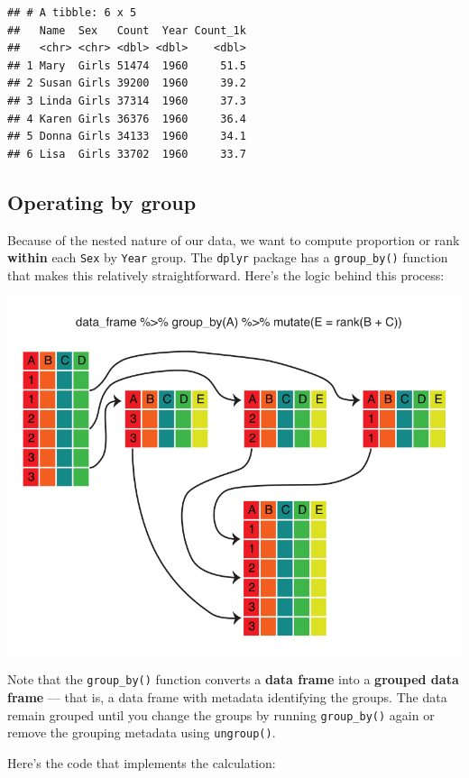\documentclass[
]{book}
\begin{document}
\begin{verbatim}
## # A tibble: 6 x 5
##   Name  Sex   Count  Year Count_1k
##   <chr> <chr> <dbl> <dbl>    <dbl>
## 1 Mary  Girls 51474  1960     51.5
## 2 Susan Girls 39200  1960     39.2
## 3 Linda Girls 37314  1960     37.3
## 4 Karen Girls 36376  1960     36.4
## 5 Donna Girls 34133  1960     34.1
## 6 Lisa  Girls 33702  1960     33.7
\end{verbatim}

\hypertarget{operating-by-group}{%
\subsection{Operating by group}\label{operating-by-group}}

Because of the nested nature of our data, we want to compute proportion
or rank \textbf{within} each \texttt{Sex} by \texttt{Year} group. The \texttt{dplyr}
package has a \texttt{group\_by()} function that makes this relatively
straightforward. Here's the logic behind this process:

\includegraphics{R/Rintro/images/mutate_group_by.png}

Note that the \texttt{group\_by()} function converts a \textbf{data frame} into a
\textbf{grouped data frame} --- that is, a data frame with metadata identifying
the groups. The data remain grouped until you change the groups by
running \texttt{group\_by()} again or remove the grouping metadata using
\texttt{ungroup()}.

Here's the code that implements the calculation:
\end{document}
